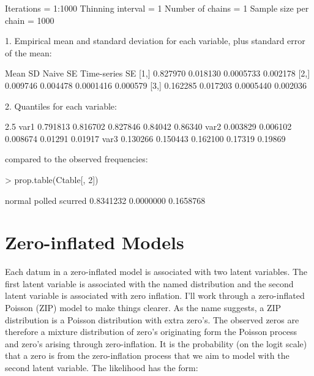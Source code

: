 \documentclass{article}
\begin{document}
\begin{Schunk}
\begin{Soutput}
Iterations = 1:1000
Thinning interval = 1 
Number of chains = 1 
Sample size per chain = 1000 

1. Empirical mean and standard deviation for each variable,
   plus standard error of the mean:

         Mean       SD  Naive SE Time-series SE
[1,] 0.827970 0.018130 0.0005733       0.002178
[2,] 0.009746 0.004478 0.0001416       0.000579
[3,] 0.162285 0.017203 0.0005440       0.002036

2. Quantiles for each variable:

         2.5%
var1 0.791813 0.816702 0.827846 0.84042 0.86340
var2 0.003829 0.006102 0.008674 0.01291 0.01917
var3 0.130266 0.150443 0.162100 0.17319 0.19869
\end{Soutput}
\end{Schunk}

compared to the observed frequencies:

\begin{Schunk}
\begin{Sinput}
> prop.table(Ctable[, 2])
\end{Sinput}
\begin{Soutput}
   normal    polled   scurred 
0.8341232 0.0000000 0.1658768 
\end{Soutput}
\end{Schunk}


\section{Zero-inflated Models}

Each datum in a zero-inflated model is associated with two latent variables. The first latent variable is associated with the named distribution and the second latent variable is associated with zero inflation. I'll work through a zero-inflated Poisson (ZIP) model to make things clearer. As the name suggests, a ZIP distribution is a Poisson distribution with extra zero's. The observed zeros are therefore a mixture distribution of zero's originating form the Poisson process and zero's arising through zero-inflation. It is the probability (on the logit scale) that a zero is from the zero-inflation process that we aim to model with the second latent variable. The likelihood has the form:
\end{document}
